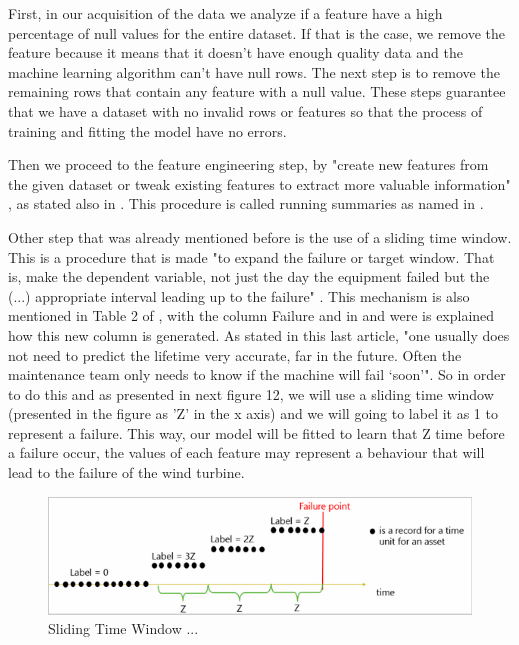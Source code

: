 First, in our acquisition of the data we analyze if a feature have a high percentage of null values for the entire dataset. If that is the case, we remove the feature because it means that it doesn't have enough quality data and the machine learning algorithm can't have null rows. The next step is to remove the remaining rows that contain any feature with a null value. These steps guarantee that we have a dataset with no invalid rows or features so that the process of training and fitting the model have no errors.

Then we proceed to the feature engineering step, by "create new features from the given dataset or tweak existing features to extract more valuable information" \cite{ML_Data_processing}, as stated also in \cite{N_7_GENERAL} \cite{MED_1}. This procedure is called running summaries as named in \cite{MED_1}.

Other step that was already mentioned before is the use of a sliding time window. This is a procedure that is made "to expand the failure or target window. That is, make the dependent variable, not just the day the equipment failed but the (...) appropriate interval leading up to the failure" \cite{MED_1}. This mechanism is also mentioned in Table 2 of \cite{N_7_GENERAL}, with the column Failure and in \cite{OLD_19_WIND} and \cite{TDC_1} were is explained how this new column is generated. As stated in this last article, "one usually does not need to predict the lifetime very accurate, far in the future. Often the maintenance team only needs to know if the machine will fail ‘soon'". So in order to do this and as presented in next figure 12, we will use a sliding time window (presented in the figure as 'Z' in the x axis) and we will going to label it as 1 to represent a failure. This way, our model will be fitted to learn that Z time before a failure occur, the values of each feature may represent a behaviour that will lead to the failure of the wind turbine.

\begin{figure}[htbp]
	\centering
	\includegraphics[scale=1.0]{Chapters/Figures/methodology_fig13.png}
	\caption{Sliding Time Window ...
	        \cite{TDC_1}}
	\label{fig:Figuras_Tree_silhouettes-vectorial}
\end{figure}

